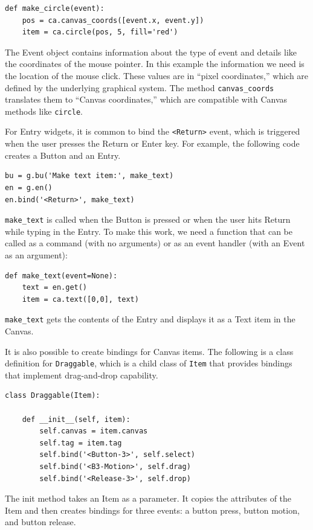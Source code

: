 \documentclass[10pt]{book}
\begin{document}
\begin{verbatim}
def make_circle(event):
    pos = ca.canvas_coords([event.x, event.y])
    item = ca.circle(pos, 5, fill='red')
\end{verbatim}
%
The Event object contains information about the type of event and
details like the coordinates of the mouse pointer.  In this example
the information we need is
the location of the mouse click.  These
values are in ``pixel coordinates,'' which are defined by the
underlying graphical system.  The method \verb"canvas_coords"
translates them to ``Canvas coordinates,'' which are compatible with
Canvas methods like {\tt circle}.

For Entry widgets, it is common to bind the \verb"<Return>" event,
which is triggered when the user presses the {\sf Return} or
{\sf Enter} key.  For example, the following code creates a Button
and an Entry.

\begin{verbatim}
bu = g.bu('Make text item:', make_text)
en = g.en()
en.bind('<Return>', make_text)
\end{verbatim}
%
\verb"make_text" is called when the Button is pressed or when
the user hits {\sf Return} while typing in the Entry.  To make
this work, we need a function that can be called as a command
(with no arguments) or as an event handler (with an Event
as an argument):

\begin{verbatim}
def make_text(event=None):
    text = en.get()
    item = ca.text([0,0], text)
\end{verbatim}
%
\verb"make_text" gets the contents of the Entry and displays
it as a Text item in the Canvas.

It is also possible to create bindings for Canvas items.
The following is a class definition for {\tt Draggable},
which is a child class of {\tt Item} that provides bindings
that implement drag-and-drop capability.

\begin{verbatim}
class Draggable(Item):

    def __init__(self, item):
        self.canvas = item.canvas
        self.tag = item.tag
        self.bind('<Button-3>', self.select)
        self.bind('<B3-Motion>', self.drag)
        self.bind('<Release-3>', self.drop)
\end{verbatim}
%
The init method takes an Item as a parameter.  It copies
the attributes of the Item and then creates bindings for
three events: a button press, button motion, and button release.
\end{document}
